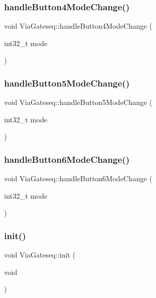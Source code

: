 \subsubsection{\texorpdfstring{handle\+Button4\+Mode\+Change()}{handleButton4ModeChange()}}
{\footnotesize\ttfamily void Via\+Gateseq\+::handle\+Button4\+Mode\+Change (\begin{DoxyParamCaption}\item[{int32\+\_\+t}]{mode }\end{DoxyParamCaption})}

\mbox{\label{class_via_gateseq_abe42605edbcd7826d040303dd4564eeb}} 
\subsubsection{\texorpdfstring{handle\+Button5\+Mode\+Change()}{handleButton5ModeChange()}}
{\footnotesize\ttfamily void Via\+Gateseq\+::handle\+Button5\+Mode\+Change (\begin{DoxyParamCaption}\item[{int32\+\_\+t}]{mode }\end{DoxyParamCaption})}

\mbox{\label{class_via_gateseq_ace1960408caf61b994b099151c663580}} 
\subsubsection{\texorpdfstring{handle\+Button6\+Mode\+Change()}{handleButton6ModeChange()}}
{\footnotesize\ttfamily void Via\+Gateseq\+::handle\+Button6\+Mode\+Change (\begin{DoxyParamCaption}\item[{int32\+\_\+t}]{mode }\end{DoxyParamCaption})}

\mbox{\label{class_via_gateseq_aff187d21f5f13cc6bd0a029aa6d6bb89}} 
\subsubsection{\texorpdfstring{init()}{init()}}
{\footnotesize\ttfamily void Via\+Gateseq\+::init (\begin{DoxyParamCaption}\item[{void}]{ }\end{DoxyParamCaption})}

